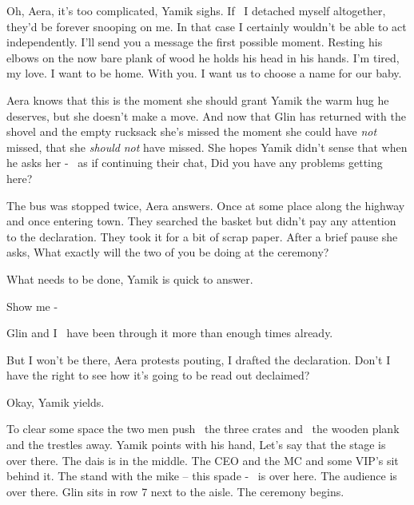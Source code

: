 \documentclass[letterpaper]{article}
\begin{document}
{\textquotedbl}Oh, Aera, it's too complicated,{\textquotedbl} Yamik sighs. {\textquotedbl}If \ I detached myself
altogether, they'd be forever snooping on\textcolor{red}{ }me. In that case I certainly wouldn't be able to act
independently. I'll send you a message the first possible moment.{\textquotedbl} Resting his elbows on the now bare
plank of wood he holds his head in his hands. {\textquotedbl}I'm tired, my love. I want to be home. With you. I want
us\textcolor[rgb]{0.0,0.4392157,0.7529412}{ }to choose a name for our baby.{\textquotedbl} 

Aera knows that this is the moment she should grant Yamik the warm hug he deserves, but she doesn't make a move. And now
that Glin has returned with the shovel and the empty rucksack she's missed the moment she could have \textit{not}
missed, that she \textit{should} \textit{not} have missed. She hopes Yamik didn't sense that when he asks her - \ as if
continuing their chat, {\textquotedbl}Did you have any problems getting here?{\textquotedbl} 

{\textquotedbl}The bus was stopped twice,{\textquotedbl} Aera answers. {\textquotedbl}Once at some place along the
highway and once entering town. They searched the basket but didn't pay any attention to the declaration. They took it
for a bit of scrap paper.{\textquotedbl} After a brief pause she asks, {\textquotedbl}What exactly will the two of you
be doing at the ceremony?{\textquotedbl} 

{\textquotedbl}What needs to be done,{\textquotedbl} Yamik is quick to answer. 

{\textquotedbl}Show me -{\textquotedbl} 

{\textquotedbl}Glin and I~ have been through it more than enough times already.{\textquotedbl} 

{\textquotedbl}But I won't be there,{\textquotedbl} Aera protests pouting, {\textquotedbl}I drafted the declaration.
Don't I have the right to see how it's going to be read out declaimed?{\textquotedbl} 

{\textquotedbl}Okay,{\textquotedbl} Yamik yields.

To clear some space the two men push \ the three crates and \ the wooden plank and the trestles
away\textcolor[rgb]{0.0,0.4392157,0.7529412}{.} Yamik points with his hand, {\textquotedbl}Let's say that the stage is
over there. The dais is in the middle. The CEO and the MC and some VIP's sit behind it. The stand with the mike -- this
spade - ~is over here. The audience is over there. Glin sits in row 7 next to the aisle. The ceremony
begins.{\textquotedbl} 
\end{document}
